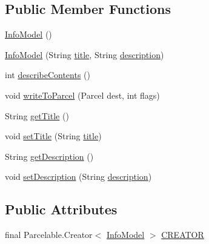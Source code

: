 \subsection*{Public Member Functions}
\begin{DoxyCompactItemize}
\item 
\hyperlink{classorg_1_1buildmlearn_1_1infotemplate_1_1data_1_1InfoModel_a650d1dec766121f89f9877ad2e575deb}{Info\+Model} ()
\item 
\hyperlink{classorg_1_1buildmlearn_1_1infotemplate_1_1data_1_1InfoModel_a1fc4fd7dc84d1dd20067570731b20cbc}{Info\+Model} (String \hyperlink{classorg_1_1buildmlearn_1_1infotemplate_1_1data_1_1InfoModel_a327aa17add320405e34960aadc6fed42}{title}, String \hyperlink{classorg_1_1buildmlearn_1_1infotemplate_1_1data_1_1InfoModel_ab9cc5ca5d5a76e595fbf540f2814d4bc}{description})
\item 
int \hyperlink{classorg_1_1buildmlearn_1_1infotemplate_1_1data_1_1InfoModel_a673ba6889bc62c36e888285198e0193f}{describe\+Contents} ()
\item 
void \hyperlink{classorg_1_1buildmlearn_1_1infotemplate_1_1data_1_1InfoModel_afffecf475aefa2f1fdb37e5024edeedf}{write\+To\+Parcel} (Parcel dest, int flags)
\item 
String \hyperlink{classorg_1_1buildmlearn_1_1infotemplate_1_1data_1_1InfoModel_a4e31fb431cac76b44f12dca1f6059340}{get\+Title} ()
\item 
void \hyperlink{classorg_1_1buildmlearn_1_1infotemplate_1_1data_1_1InfoModel_a3d36ad1a49ac3a6a1fdb5c07379e0057}{set\+Title} (String \hyperlink{classorg_1_1buildmlearn_1_1infotemplate_1_1data_1_1InfoModel_a327aa17add320405e34960aadc6fed42}{title})
\item 
String \hyperlink{classorg_1_1buildmlearn_1_1infotemplate_1_1data_1_1InfoModel_a4489859111197490f07f5422129f700f}{get\+Description} ()
\item 
void \hyperlink{classorg_1_1buildmlearn_1_1infotemplate_1_1data_1_1InfoModel_a38c1c82fe0160da9386a4b28d91a21dd}{set\+Description} (String \hyperlink{classorg_1_1buildmlearn_1_1infotemplate_1_1data_1_1InfoModel_ab9cc5ca5d5a76e595fbf540f2814d4bc}{description})
\end{DoxyCompactItemize}
\subsection*{Public Attributes}
\begin{DoxyCompactItemize}
\item 
final Parcelable.\+Creator$<$ \hyperlink{classorg_1_1buildmlearn_1_1infotemplate_1_1data_1_1InfoModel}{Info\+Model} $>$ \hyperlink{classorg_1_1buildmlearn_1_1infotemplate_1_1data_1_1InfoModel_ae35b754656daaf2d9f2465dd7583a9f6}{C\+R\+E\+A\+T\+OR}
\end{DoxyCompactItemize}
